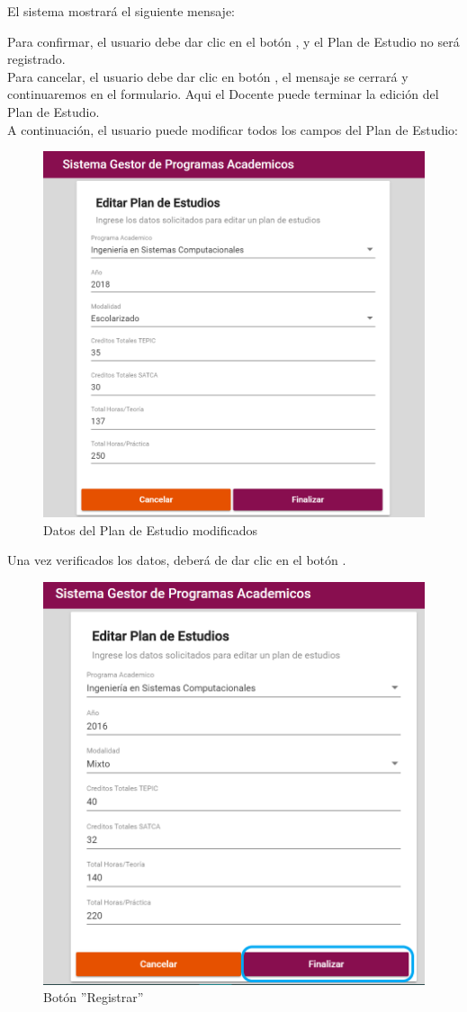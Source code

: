 El sistema mostrará el siguiente mensaje:

Para confirmar, el usuario debe dar clic en el botón  , y el Plan de Estudio no será registrado.\\

Para cancelar, el usuario debe dar clic en botón  , el mensaje se cerrará y continuaremos en el formulario. Aqui el Docente puede terminar la edición del Plan de Estudio.\\
\newpage
A continuación, el usuario puede modificar todos los campos del Plan de Estudio:
\begin{figure}[!hbtp]
	\centering
	\hypertarget{modif}{\includegraphics[width=0.7\linewidth]{images/SP4-GPE/editarPE}}
	\caption{Datos del Plan de Estudio modificados}
	\label{modif}
\end{figure}
\newpage

Una vez verificados los datos, deberá de dar clic en el botón  .
\begin{figure}[!hbtp]
	\centering
	\hypertarget{btnfin}{\includegraphics[width=0.7\linewidth]{images/SP4-GPE/editarPER}}
	\caption{Botón ''Registrar''}
	\label{btnfin}
\end{figure}

